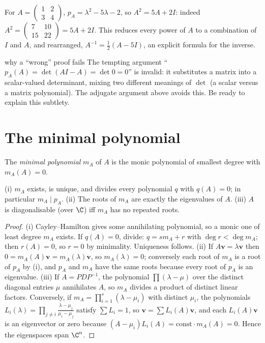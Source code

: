 \begin{example}
For $A=\begin{pmatrix}1&2\\3&4\end{pmatrix}$, $p_A=\lambda^2-5\lambda-2$, so $A^2=5A+2I$: indeed $A^2=\begin{pmatrix}7&10\\15&22\end{pmatrix}=5A+2I$. This reduces every power of $A$ to a combination of $I$ and $A$, and rearranged, $A^{-1}=\tfrac12(A-5I)$, an explicit formula for the inverse.
\end{example}

\begin{interview}{why a ``wrong'' proof fails}
The tempting argument ``$p_A(A)=\det(AI-A)=\det0=0$'' is invalid: it substitutes a matrix into a scalar-valued determinant, mixing two different meanings of $\det$ (a scalar versus a matrix polynomial). The adjugate argument above avoids this. Be ready to explain this subtlety.
\end{interview}

\section{The minimal polynomial}

\begin{definition}
The \emph{minimal polynomial} $m_A$ of $A$ is the monic polynomial of smallest degree with $m_A(A)=0$.
\end{definition}

\begin{theorem}[Properties]\label{thm:minpoly}
(i) $m_A$ exists, is unique, and divides every polynomial $q$ with $q(A)=0$; in particular $m_A\mid p_A$. (ii) The roots of $m_A$ are exactly the eigenvalues of $A$. (iii) $A$ is diagonalisable (over $\C$) iff $m_A$ has no repeated roots.
\end{theorem}

\begin{proof}
(i) Cayley--Hamilton gives some annihilating polynomial, so a monic one of least degree $m_A$ exists. If $q(A)=0$, divide: $q=sm_A+r$ with $\deg r<\deg m_A$; then $r(A)=0$, so $r=0$ by minimality. Uniqueness follows. (ii) If $A\mathbf{v}=\lambda\mathbf{v}$ then $0=m_A(A)\mathbf{v}=m_A(\lambda)\mathbf{v}$, so $m_A(\lambda)=0$; conversely each root of $m_A$ is a root of $p_A$ by (i), and $p_A$ and $m_A$ have the same roots because every root of $p_A$ is an eigenvalue. (iii) If $A=PDP^{-1}$, the polynomial $\prod(\lambda-\mu)$ over the distinct diagonal entries $\mu$ annihilates $A$, so $m_A$ divides a product of distinct linear factors. Conversely, if $m_A=\prod_{i=1}^s(\lambda-\mu_i)$ with distinct $\mu_i$, the polynomials $L_i(\lambda)=\prod_{j\ne i}\frac{\lambda-\mu_j}{\mu_i-\mu_j}$ satisfy $\sum L_i=1$, so $\mathbf{v}=\sum L_i(A)\mathbf{v}$, and each $L_i(A)\mathbf{v}$ is an eigenvector or zero because $(A-\mu_i)L_i(A)=\text{const}\cdot m_A(A)=0$. Hence the eigenspaces span $\C^n$.
\end{proof}

